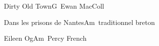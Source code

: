 \begin{song}{Dirty Old Town}{G}{~}{Ewan MacColl}{}{}
	
\end{song}

\begin{song}{Dans les prisons de Nantes}{Am}{~}{traditionnel breton}{}{}
	
\end{song}

\begin{song}{Eileen Og}{Am}{~}{Percy French}{}{}
	
\end{song}

